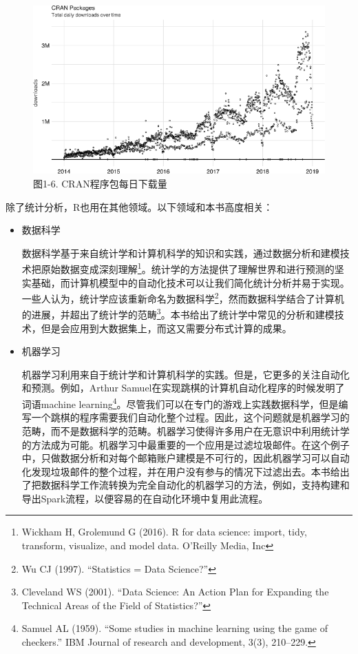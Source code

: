 \documentclass[
]{article}
\begin{document}
\begin{figure}
\centering
\includegraphics{figures/1_6.png}
\caption{图1-6. CRAN程序包每日下载量}
\end{figure}

除了统计分析，R也用在其他领域。以下领域和本书高度相关：

\begin{itemize}
\item
  数据科学

  数据科学基于来自统计学和计算机科学的知识和实践，通过数据分析和建模技术把原始数据变成深刻理解\footnote{Wickham
    H, Grolemund G (2016). R for data science: import, tidy, transform,
    visualize, and model data. O'Reilly Media, Inc}。统计学的方法提供了理解世界和进行预测的坚实基础，而计算机模型中的自动化技术可以让我们简化统计分析并易于实现。一些人认为，统计学应该重新命名为数据科学\footnote{Wu
    CJ (1997). ``Statistics = Data Science?''}，然而数据科学结合了计算机的进展，并超出了统计学的范畴\footnote{Cleveland
    WS (2001). ``Data Science: An Action Plan for Expanding the
    Technical Areas of the Field of Statistics?''}。本书给出了统计学中常见的分析和建模技术，但是会应用到大数据集上，而这又需要分布式计算的成果。
\end{itemize}

\begin{itemize}
\item
  机器学习

  机器学习利用来自于统计学和计算机科学的实践。但是，它更多的关注自动化和预测。例如，Arthur
  Samuel在实现跳棋的计算机自动化程序的时候发明了词语machine
  learning\footnote{Samuel AL (1959). ``Some studies in machine learning
    using the game of checkers.'' IBM Journal of research and
    development, 3(3), 210--229.}。尽管我们可以在专门的游戏上实践数据科学，但是编写一个跳棋的程序需要我们自动化整个过程。因此，这个问题就是机器学习的范畴，而不是数据科学的范畴。机器学习使得许多用户在无意识中利用统计学的方法成为可能。机器学习中最重要的一个应用是过滤垃圾邮件。在这个例子中，只做数据分析和对每个邮箱账户建模是不可行的，因此机器学习可以自动化发现垃圾邮件的整个过程，并在用户没有参与的情况下过滤出去。本书给出了把数据科学工作流转换为完全自动化的机器学习的方法，例如，支持构建和导出Spark流程，以便容易的在自动化环境中复用此流程。
\end{itemize}
\end{document}
